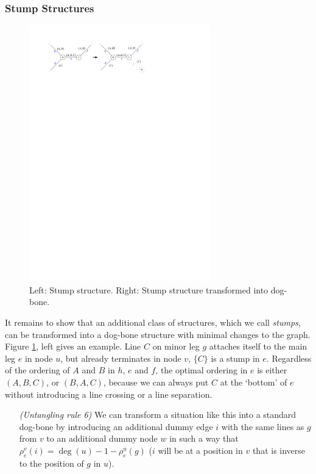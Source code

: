 \documentclass[format=acmsmall, review=false, screen=true]{acmart}
\begin{document}
\subsubsection{Stump Structures}

\begin{figure}
  \includegraphics[width=0.7\textwidth, page=1]{untangling/stump.pdf}
  \caption{Left: Stump structure. Right: Stump structure transformed into dog-bone.}  
  \label{FIG:untangle_stump}
\end{figure}

It remains to show that an additional class of structures, which we call \emph{stumps}, can be transformed into a dog-bone structure with minimal changes to the graph.
Figure \ref{FIG:untangle_stump}, left gives an example. Line $C$ on minor leg $g$ attaches itself to the main leg $e$ in node $u$, but already terminates in node $v$, $\{C\}$ is a stump in $e$.
Regardless of the ordering of $A$ and $B$ in $h$, $e$ and $f$, the optimal ordering in $e$ is either $(A, B, C)$, or $(B, A, C)$, because we can always put $C$ at the `bottom' of $e$ without introducing a line crossing or a line separation.
\begin{enumerate}[parsep=0.5mm, wide, labelwidth=0mm, itemindent=2.3mm]
  \setlength\itemsep{1pt}
  \item[\emph{(Untangling rule 6)}]We can transform a situation like this into a standard dog-bone by introducing an additional dummy edge $i$ with the same lines as $g$ from $v$ to an additional dummy node $w$ in such a way that $\rho^v_e(i) = \deg(u) - 1 - \rho^u_e(g)$ ($i$ will be at a position in $v$ that is inverse to the position of $g$ in $u$). 
\end{enumerate}
\end{document}
